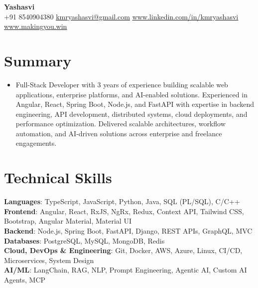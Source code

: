 \documentclass[letterpaper,11pt]{article}
\newcommand{\resumeItem}[1]{\item\small{{#1 \vspace{-2pt}}}}
\newcommand{\resumeSubHeadingListStart}{\begin{itemize}[leftmargin=0.0in, label={}]}
\newcommand{\resumeSubHeadingListEnd}{\end{itemize}}
\begin{document}
\begin{center}
    {\Huge\bfseries Yashasvi} \\ \vspace{1pt}
    \small
    +91 8540904380 \hspace{0.5em}\textbar \hspace{0.5em}
    \href{mailto:kmryashasvi@gmail.com}{\underline{kmryashasvi@gmail.com}}
    \hspace{0.5em}\textbar\hspace{0.5em}
    \href{https://linkedin.com/in/kmryashasvi}{\underline{www.linkedin.com/in/kmryashasvi}}
    \hspace{0.5em}\textbar\hspace{0.5em}
    \href{https://makingyou.win}{\underline{www.makingyou.win}}
    \vspace{-8pt}
\end{center}

\section{Summary}
\resumeSubHeadingListStart
\resumeItem{Full-Stack Developer with 3 years of experience building scalable web applications, enterprise platforms, and AI-enabled solutions. Experienced in Angular, React, Spring Boot, Node.js, and FastAPI with expertise in backend engineering, API development, distributed systems, cloud deployments, and performance optimization. Delivered scalable architectures, workflow automation, and AI-driven solutions across enterprise and freelance engagements.}
\resumeSubHeadingListEnd
\vspace{-10pt}

\section{Technical Skills}
\begin{itemize}[leftmargin=0.15in, label={}]
\small{\item{
\textbf{Languages}{: TypeScript, JavaScript, Python, Java, SQL (PL/SQL), C/C++} \\
\textbf{Frontend}{: Angular, React, RxJS, NgRx, Redux, Context API, Tailwind CSS, Bootstrap, Angular Material, Material UI} \\
\textbf{Backend}{: Node.js, Spring Boot, FastAPI, Django, REST APIs, GraphQL, MVC} \\
\textbf{Databases}{: PostgreSQL, MySQL, MongoDB, Redis} \\
\textbf{Cloud, DevOps \& Engineering}{: Git, Docker, AWS, Azure, Linux, CI/CD, Microservices, System Design} \\
\textbf{AI/ML}{: LangChain, RAG, NLP, Prompt Engineering, Agentic AI, Custom AI Agents, MCP}
}}
\end{itemize}
\vspace{-12pt}
\end{document}
